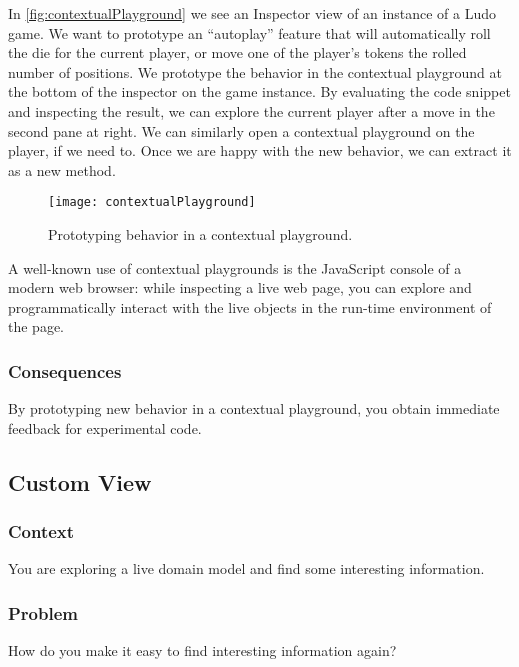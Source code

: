 \documentclass[sigconf]{acmart}
\begin{document}
In \autoref{fig:contextualPlayground} we see an Inspector view of an instance of a Ludo game.
We want to prototype an ``autoplay'' feature that will automatically roll the die for the current player, or move one of the player's tokens the rolled number of positions.
We prototype the behavior in the contextual playground at the bottom of the inspector on the game instance.
By evaluating the code snippet and inspecting the result, we can explore the current player after a move in the second pane at right.
We can similarly open a contextual playground on the player, if we need to.
Once we are happy with the new behavior, we can extract it as a new method.

\begin{figure}[h]
  \texttt{[image: contextualPlayground]}
  \caption{Prototyping behavior in a contextual playground.}
  \label{fig:contextualPlayground}
\end{figure}

A well-known use of contextual playgrounds is the JavaScript console of a modern web browser: while inspecting a live web page, you can explore and programmatically interact with the live objects in the run-time environment of the page.

\subsubsection*{Consequences}
By prototyping new behavior in a contextual playground, you obtain immediate feedback for experimental code.

\subsection*{Custom View}\label{pat:customView}
\subsubsection*{Context}
You are exploring a live domain model and find some interesting information.

\subsubsection*{Problem}
How do you make it easy to find interesting information again?
\end{document}
